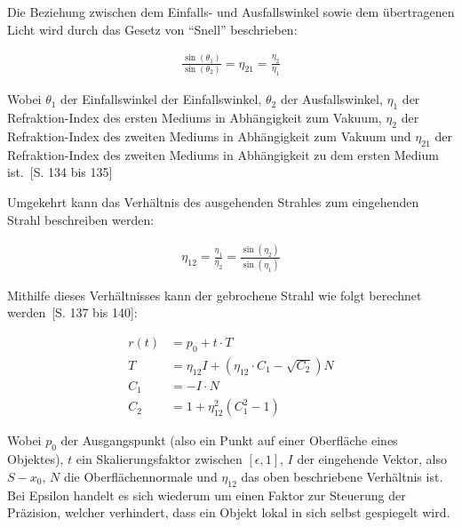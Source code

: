Die Beziehung zwischen dem Einfalls- und Ausfallswinkel sowie dem
übertragenen Licht wird durch das Gesetz von ``Snell'' beschrieben:

\begin{gather}
    \frac{\sin(\theta_{1})}{\sin(\theta_{2})} = \eta_{21} = \frac{\eta_{2}}{\eta_{1}}
\end{gather}

Wobei $\theta_{1}$ der Einfallswinkel der Einfallswinkel, $\theta_{2}$
der Ausfallswinkel, $\eta_{1}$ der Refraktion-Index des ersten Mediums
in Abhängigkeit zum Vakuum, $\eta_{2}$ der Refraktion-Index des zweiten
Mediums in Abhängigkeit zum Vakuum und $\eta_{21}$ der Refraktion-Index
des zweiten Mediums in Abhängigkeit zu dem ersten Medium
ist.~\cite{glassner_introduction_1989}[S. 134 bis 135]

Umgekehrt kann das Verhältnis des ausgehenden Strahles zum eingehenden
Strahl beschreiben werden:

\begin{gather}
    \eta_{12} = \frac{\eta_{1}}{\eta_{2}} = \frac{\sin(\eta_{2})}{\sin(\eta_{1})}
\end{gather}

Mithilfe dieses Verhältnisses kann der gebrochene Strahl wie folgt
berechnet werden~\cite{glassner_introduction_1989}[S. 137 bis 140]:

\begin{align}
    r(t) &= p_{0} + t \cdot T \\
    T &= \eta_{12}I + (\eta_{12} \cdot C_{1} - \sqrt{C_{2}})N
    \label{eq:ray_tracing:transm} \\
    C_{1} &= -I \cdot N \\
    C_{2} &= 1 + \eta_{12}^{2}(C_{1}^{2} - 1) \label{eq:ray_tracing:transm_c2}
\end{align}

Wobei $p_{0}$ der Ausgangspunkt (also ein Punkt auf einer Oberfläche
eines Objektes), $t$ ein Skalierungsfaktor zwischen $[\epsilon, 1]$, $I$
der eingehende Vektor, also $S - x_{0}$, $N$ die Oberflächennormale und
$\eta_{12}$ das oben beschriebene Verhältnis ist.
Bei Epsilon handelt es sich wiederum um einen Faktor zur Steuerung
der Präzision, welcher verhindert, dass ein Objekt lokal in sich selbst
gespiegelt wird.

